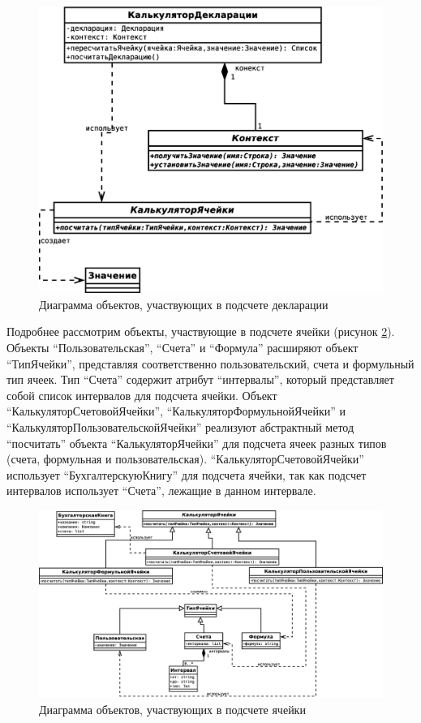 \documentclass[14pt,a4paper]{reportmod}
\begin{document}
\begin{figure}
  \centering
  \includegraphics[scale=0.4]{uml/_classes_3}
  \caption{Диаграмма объектов, участвующих в подсчете декларации}
  \label{pic:classes_3}
\end{figure}

Подробнее рассмотрим объекты, участвующие в подсчете ячейки (рисунок \ref{pic:classes_2}). Объекты ``Пользовательская'', ``Счета'' и ``Формула'' расширяют объект ``ТипЯчейки'', представляя соответственно пользовательский, счета и формульный тип ячеек. Тип ``Счета'' содержит атрибут ``интервалы'', который представляет собой список интервалов для подсчета ячейки. Объект ``КалькуляторСчетовойЯчейки'', ``КалькуляторФормульнойЯчейки'' и ``КалькуляторПользовательскойЯчейки'' реализуют абстрактный метод ``посчитать'' объекта ``КалькуляторЯчейки'' для подсчета ячеек разных типов (счета, формульная и пользовательская). ``КалькуляторСчетовойЯчейки'' использует ``БухгалтерскуюКнигу'' для подсчета ячейки, так как подсчет интервалов использует ``Счета'', лежащие в данном интервале.

\begin{figure}
  \centering
  \includegraphics[scale=0.4]{uml/_classes_2}
  \caption{Диаграмма объектов, участвующих в подсчете ячейки}
  \label{pic:classes_2}
\end{figure}
\end{document}
